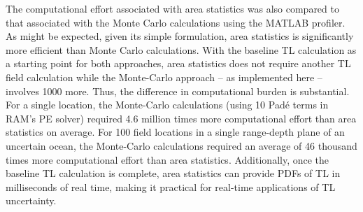 The computational effort associated with area statistics was also
compared to that associated with the Monte Carlo calculations using
the MATLAB profiler. As might be expected, given its simple
formulation, area statistics is significantly more efficient than
Monte Carlo calculations. With the baseline TL calculation as a
starting point for both approaches, area statistics does not require
another TL field calculation while the Monte-Carlo approach – as
implemented here – involves 1000 more. Thus, the difference in
computational burden is substantial. For a single location, the
Monte-Carlo calculations (using 10 Padé terms in RAM's PE solver)
required 4.6 million times more computational effort than area
statistics on average. For 100 field locations in a single range-depth
plane of an uncertain ocean, the Monte-Carlo calculations required an
average of 46 thousand times more computational effort than area
statistics. Additionally, once the baseline TL calculation is
complete, area statistics can provide PDFs of TL in milliseconds of
real time, making it practical for real-time applications of TL
uncertainty.

